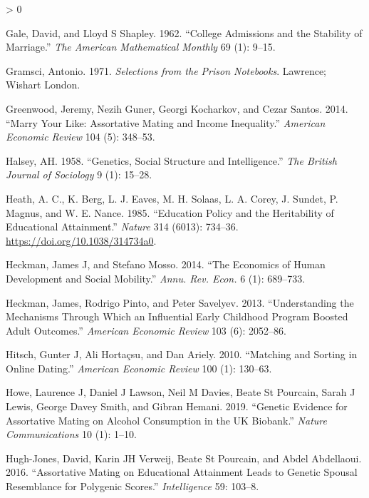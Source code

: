 \documentclass[
]{article}
\newlength{\cslhangindent}
\newenvironment{CSLReferences}[2] %
 {%
  \setlength{\parindent}{0pt}
  \ifodd #1 \everypar{\setlength{\hangindent}{\cslhangindent}}\ignorespaces\fi
  \ifnum #2 > 0
  \setlength{\parskip}{#2\baselineskip}
  \fi
 }%
 {}
\begin{document}
\begin{CSLReferences}{1}{0}
\leavevmode\hypertarget{ref-gale1962college}{}%
Gale, David, and Lloyd S Shapley. 1962. {``College Admissions and the Stability of Marriage.''} \emph{The American Mathematical Monthly} 69 (1): 9--15.

\leavevmode\hypertarget{ref-gramsci1971selections}{}%
Gramsci, Antonio. 1971. \emph{Selections from the Prison Notebooks}. Lawrence; Wishart London.

\leavevmode\hypertarget{ref-greenwood2014marry}{}%
Greenwood, Jeremy, Nezih Guner, Georgi Kocharkov, and Cezar Santos. 2014. {``Marry Your Like: Assortative Mating and Income Inequality.''} \emph{American Economic Review} 104 (5): 348--53.

\leavevmode\hypertarget{ref-halsey1958genetics}{}%
Halsey, AH. 1958. {``Genetics, Social Structure and Intelligence.''} \emph{The British Journal of Sociology} 9 (1): 15--28.

\leavevmode\hypertarget{ref-Heath_1985}{}%
Heath, A. C., K. Berg, L. J. Eaves, M. H. Solaas, L. A. Corey, J. Sundet, P. Magnus, and W. E. Nance. 1985. {``Education Policy and the Heritability of Educational Attainment.''} \emph{Nature} 314 (6013): 734--36. \url{https://doi.org/10.1038/314734a0}.

\leavevmode\hypertarget{ref-heckman2014economics}{}%
Heckman, James J, and Stefano Mosso. 2014. {``The Economics of Human Development and Social Mobility.''} \emph{Annu. Rev. Econ.} 6 (1): 689--733.

\leavevmode\hypertarget{ref-heckman2013understanding}{}%
Heckman, James, Rodrigo Pinto, and Peter Savelyev. 2013. {``Understanding the Mechanisms Through Which an Influential Early Childhood Program Boosted Adult Outcomes.''} \emph{American Economic Review} 103 (6): 2052--86.

\leavevmode\hypertarget{ref-hitsch2010matching}{}%
Hitsch, Gunter J, Ali Hortaçsu, and Dan Ariely. 2010. {``Matching and Sorting in Online Dating.''} \emph{American Economic Review} 100 (1): 130--63.

\leavevmode\hypertarget{ref-howe2019genetic}{}%
Howe, Laurence J, Daniel J Lawson, Neil M Davies, Beate St Pourcain, Sarah J Lewis, George Davey Smith, and Gibran Hemani. 2019. {``Genetic Evidence for Assortative Mating on Alcohol Consumption in the UK Biobank.''} \emph{Nature Communications} 10 (1): 1--10.

\leavevmode\hypertarget{ref-hugh2016assortative}{}%
Hugh-Jones, David, Karin JH Verweij, Beate St Pourcain, and Abdel Abdellaoui. 2016. {``Assortative Mating on Educational Attainment Leads to Genetic Spousal Resemblance for Polygenic Scores.''} \emph{Intelligence} 59: 103--8.


\end{CSLReferences}
\end{document}
